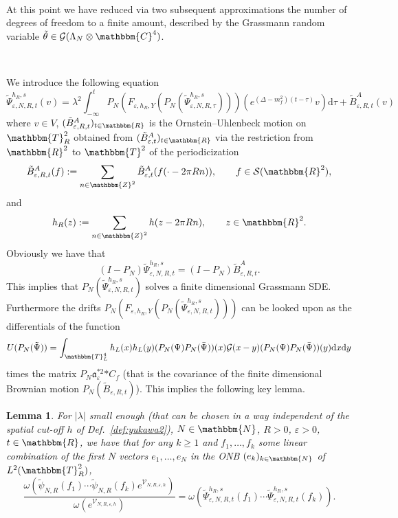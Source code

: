 \documentclass[11pt]{article}
\newcommand{\assign}{:=}
\newcommand{\asterisk}{\mathord{*}}
\newcommand{\mathd}{\mathrm{d}}
\newtheorem{lemma}{Lemma}
\begin{document}
\

At this point we have reduced via two subsequent approximations the number of
degrees of freedom to a finite amount, described by the Grassmann random
variable $\tilde{\theta} \in \mathcal{G} (\Lambda_N \otimes \mathbbm{C}^4)$.

\

We introduce the following equation
\begin{equation}
  \tilde{\Psi}^{h_R, s}_{\varepsilon, N, R, t} (v) = \lambda^2 \int_{-
  \infty}^t P_N (F_{\varepsilon, h_R, Y} (P_N (\tilde{\Psi}_{\varepsilon, N,
  R, \tau}^{h_R, s}))) (e^{(\Delta - m^2_f) (t - \tau)} v) \mathd \tau +
  \tilde{B}_{\varepsilon, R, t}^A (v) \label{eq:finitedimensional}
\end{equation}
where $v \in V$, $(\tilde{B}_{\varepsilon, R, t}^A)_{t \in \mathbbm{R}}$ is the
Ornstein--Uhlenbeck motion on $\mathbbm{T}^2_R$ obtained from
$(\tilde{B}_{\varepsilon, t}^A)_{t \in \mathbbm{R}}$ via the restriction from
$\mathbbm{R}^2$ to $\mathbbm{T}^2$ of the periodicization
\[ \tilde{B}_{\varepsilon, R, t}^A (f) \assign \sum_{n \in \mathbbm{Z}^2}
   \tilde{B}_{\varepsilon, t}^A (f (\cdot - 2 \pi R n)), \qquad f \in
   \mathcal{S} (\mathbbm{R}^2), \]
and
\[ h_R (z) \assign \sum_{n \in \mathbbm{Z}^2} h (z - 2 \pi R n), \qquad z \in
   \mathbbm{R}^2 . \]
Obviously we have that
\[ (I - P_N) \tilde{\Psi}_{\varepsilon, N, R, t}^{h_R, s} = (I - P_N)
   \tilde{B}^A_{\varepsilon, R, t} . \]
This implies that $P_N (\tilde{\Psi}_{\varepsilon, N, R, t}^{h_R, s})$ solves
a finite dimensional Grassmann SDE. Furthermore the drifts $P_N
(F_{\varepsilon, h_R, Y} (P_N (\tilde{\Psi}_{\varepsilon, N, R, t}^{h_R,
s})))$ can be looked upon as the differentials of the function
\[ U (P_N (\tilde{\Psi})) = \int_{\mathbbm{T}_L^4} h_L (x) h_L (y) (P_N (\Psi)
   P_N (\bar{\Psi})) (x) \mathcal{G} (x - y) (P_N (\Psi) P_N (\bar{\Psi})) (y)
   \mathd x \mathd y \]
times the matrix $P_N \mathfrak{a}_{\varepsilon}^{\asterisk 2} \asterisk C_f$
(that is the covariance of the finite dimensional Brownian motion $P_N
(\tilde{B}_{\varepsilon, R, t})$). This implies the following key lemma.

\begin{lemma}
  \label{lemma_finite1}For $| \lambda |$ small enough (that can be chosen in a
  way independent of the spatial cut-off $h$ of Def.~\ref{def:yukawa2}), $N
  \in \mathbbm{N}$, $R > 0$, $\varepsilon > 0$, $t \in \mathbbm{R}$, we have
  that for any $k \geqslant 1$ and $f_1, \ldots, f_k$ some linear combination
  of the first $N$ vectors $e_1, \ldots, e_N$ in the ONB $(e_k)_{k \in
  \mathbbm{N}}$ of $L^2 (\mathbbm{T}^2_R)$,
  \[ \frac{\omega (\tilde{\psi}_{N, R} (f_1) \cdots \tilde{\psi}_{N, R} (f_k)
     e^{\mathcal{V}_{N, R, \varepsilon, h}})}{\omega (e^{\mathcal{V}_{N, R,
     \varepsilon, h}})} = \omega (\tilde{\Psi}_{\varepsilon, N, R, t}^{h_R, s}
     (f_1) \cdots \tilde{\Psi}_{\varepsilon, N, R, t}^{h_R, s} (f_k)) . \]
\end{lemma}
\end{document}
